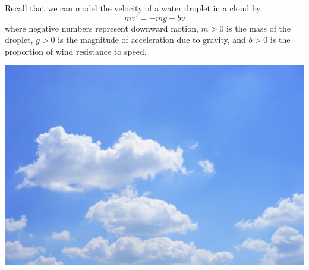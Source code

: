 

\begin{applicationActivities}



\begin{observation}
Recall that we can model the velocity of a water droplet in a cloud by
\[mv'=-mg-bv\]
where negative numbers represent downward motion,
\(m>0\) is the mass of the droplet, 
\(g>0\) is the magnitude of acceleration due to gravity, and 
\(b>0\) is the proportion of wind resistance to speed.
\begin{center}
\includegraphics[scale=0.2]{media/cloud.jpg}
\end{center}
\end{observation}

%
%


\end{applicationActivities}
